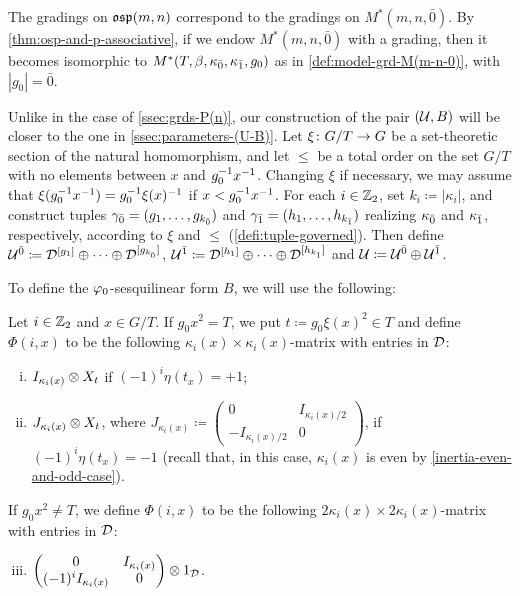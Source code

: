 The gradings on $\mathfrak{osp}(m,n)$ correspond to the gradings on $M^*(m, n, \bar 0)$. 
By \cref{thm:osp-and-p-associative}, if we endow $M^*(m, n, \bar 0)$ with a grading, then it becomes isomorphic to $M^*(T, \beta, \kappa_{\bar{0}}, \kappa_{\bar{1}}, g_0)$ as in \cref{def:model-grd-M(m-n-0)}, with $|g_0| = \bar 0$. 

Unlike in the case of \cref{ssec:grds-P(n)}, our construction of the pair $(\mathcal U, B)$ will be closer to the one in \cref{ssec:parameters-(U-B)}. 
Let $\xi\colon G/T \to G$ be a set-theoretic section of the natural homomorphism, and let $\leq$ be a total order on the set $G/T$ with no elements between $x$ and $g_0^{-1} x^{-1}$. 
Changing $\xi$ if necessary, we may assume that $\xi(g_0^{-1} x^{-1}) = g_0^{-1} \xi(x)^{-1}$ if $x < g_0^{-1} x^{-1}$. 
For each $i \in \mathbb{Z}_2$, set $k_i \coloneqq |\kappa_i|$, and construct tuples $\gamma_{\bar{0}} = (g_1, \ldots, g_{k_{\bar{0}}})$ and $\gamma_{\bar{1}} = (h_1, \ldots, h_{k_{\bar{1}}})$ realizing $\kappa_{\bar{0}}$ and $\kappa_{\bar{1}}$, respectively, according to $\xi$ and $\leq$ (\cref{defi:tuple-governed}). 
Then define $\mathcal U^{\bar0} \coloneqq \mathcal{D}^{[g_1]} \oplus \cdots \oplus \mathcal{D}^{[g_{k_{\bar{0}}}]}$, $\mathcal U^{\bar1} \coloneqq \mathcal{D}^{[h_1]} \oplus \cdots \oplus \mathcal{D}^{[h_{k_{\bar{1}}}]}$ and $\mathcal U \coloneqq \mathcal U^{\bar0} \oplus \mathcal U^{\bar1}$. 

To define the $\varphi_0$-sesquilinear form $B$, we will use the following:

\begin{defi}\label{defi:blocks-of-Phi}
    Let $i\in \mathbb{Z}_2$ and $x \in G/T$. 
    If $g_0x^2 = T$, we put $t \coloneqq g_0 \xi(x)^2 \in T$ and define $\Phi(i, x)$ to be the following $\kappa_i(x) \times \kappa_i(x)$-matrix with entries in $\mathcal{D}$:
    \begin{enumerate}[(i)]
        \item $I_{\kappa_i(x)} \otimes X_{t}$ if $(-1)^i \eta(t_x) = +1$;
		\item  $J_{\kappa_i(x)} \otimes X_{t}$, where $J_{\kappa_i(x)} \coloneqq \begin{pmatrix}
				      0                & I_{\kappa_i(x)/2} \\
				      -I_{\kappa_i(x)/2} & 0
			      \end{pmatrix}$, if  $(-1)^i \eta(t_x) = -1$ (recall that, in this case, $\kappa_i(x)$ is even by \cref{inertia-even-and-odd-case}). 
	\end{enumerate}
    If $g_0 x^2 \neq T$, we define $\Phi(i, x)$ to be the following $2\kappa_i(x) \times 2\kappa_i(x)$-matrix with entries in $\mathcal{D}$:
    \begin{enumerate}[(i)]
        \setcounter{enumi}{2}
		\item $\begin{pmatrix}
			0                                                  & I_{\kappa_i(x)} \\
			(-1)^{i} I_{\kappa_i(x)} & 0
		\end{pmatrix} \otimes 1_{\mathcal{D}}$. 
    \end{enumerate}
\end{defi}

